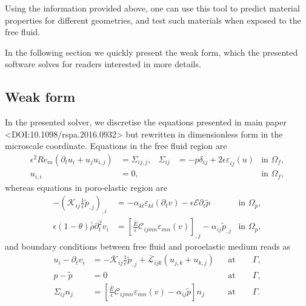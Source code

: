 \documentclass[12pt,a4paper]{article}
\newcommand{\pdt}{\partial_t}
\newcommand{\str}[3]{\varepsilon^{#1}_{#2} \left( #3 \right)}
\newcommand{\ord}{\epsilon}
\begin{document}
Using the information provided above, one can use this tool to predict material properties for different geometries, and test such materials when exposed to the free fluid.

In the following section we quickly present the weak form, which the presented software solves for readers interested in more details.

\subsection{Weak form}

In the presented solver, we discretise the equations presented in main paper <DOI:10.1098/rspa.2016.0932> but rewritten in dimensionless form in the microscale coordinate. Equations in the free fluid region are
\begin{align}
\ord^2 Re_m \left( \pdt u_i  + u_j u_{i,j} \right) & = \Sigma_{ij,j}, &  \Sigma_{ij} & = -p \delta_{ij} + 2 \ord \str{}{ij}{u}  & \mbox{in } \Omega_f, \\
u_{i,i} & = 0, & &  & \mbox{in } \Omega_f, 
\end{align}
whereas equations in poro-elastic region are
\begin{align}
- \left( \mathcal{K}_{ij} \frac{1}{\ord} \tilde{p}_{,j} \right)_{,i} & = - \alpha_{kl} \str{}{kl}{ \pdt v }  - \ord \mathcal{E} \pdt \tilde{p}   & \mbox{in } \Omega_p,\\
\ord \left(1 - \theta \right) \bar{\bar{\rho}} \pdt^2 v_i & = \left[ \frac{\bar{\bar{E}}}{\ord} \mathcal{C}_{ijmn} \str{}{mn}{ v } \right]_{,j} - \alpha_{ij} \tilde{p}_{,j}   & \mbox{in } \Omega_p,
\end{align}
and boundary conditions between free fluid and poroelastic medium reads as
\begin{align}
u_i - \pdt v_i & =  - \mathcal{\bar{K}}_{ij} \frac{1}{\ord} \tilde{p}_{,j} + \mathcal{\bar{L}}_{ijk} \left( u_{j,k} + u_{k,j} \right)  & & \textrm{at}\qquad \Gamma, \\
p - \tilde{p} & = 0  & & \textrm{at}\qquad \Gamma, \\
\Sigma_{ij} n_j & = \left[ \frac{\bar{\bar{E}}}{\ord} \mathcal{C}_{ijmn} \str{}{mn}{ v } - \alpha_{ij} \tilde{p} \right] n_j  & & \textrm{at}\qquad \Gamma.
\end{align}
\end{document}
